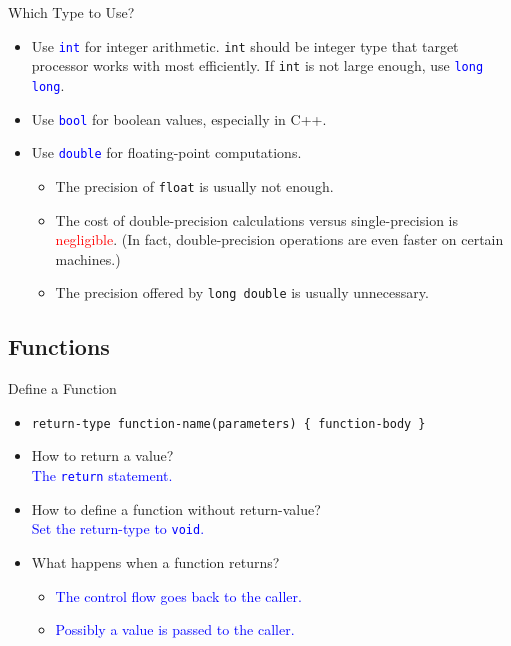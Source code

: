 \documentclass[handout]{beamer}
\newcommand{\red}[1]{\textcolor{red}{#1}}
\newcommand{\blue}[1]{\textcolor{blue}{#1}}
\begin{document}
\begin{frame}{Which Type to Use?}
    \begin{itemize}
        \item Use \blue{\texttt{int}} for integer arithmetic. \texttt{int} should be integer type that target processor works with most efficiently. If \texttt{int} is not large enough, use \blue{\texttt{long long}}.
        \item Use \blue{\texttt{bool}} for boolean values, especially in C++.
        \item Use \blue{\texttt{double}} for floating-point computations.
        \pause
        \begin{itemize}
            \item The precision of \texttt{float} is usually not enough.
            \item The cost of double-precision calculations versus single-precision is \red{negligible}. (In fact, double-precision operations are even faster on certain machines.)
            \item The precision offered by \texttt{long double} is usually unnecessary.
        \end{itemize}
    \end{itemize}
\end{frame}

\subsection{Functions}

\begin{frame}{Define a Function}
    \begin{itemize}
        \item \texttt{return-type function-name(parameters) \{ function-body \}}
        \item How to return a value?\\
        \pause
        \blue{The \texttt{return} statement.}
        \pause
        \item How to define a function without return-value?\\
        \pause
        \blue{Set the return-type to \texttt{void}.}
        \pause
        \item What happens when a function returns?
        \pause
        \begin{itemize}
            \item \blue{The control flow goes back to the caller.}
            \item \blue{Possibly a value is passed to the caller.}
        \end{itemize}
    \end{itemize}
\end{frame}
\end{document}
